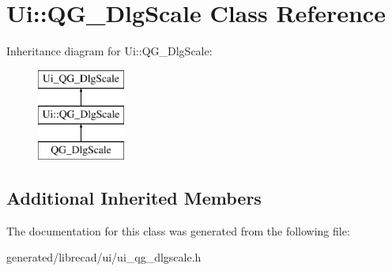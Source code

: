\hypertarget{classUi_1_1QG__DlgScale}{\section{Ui\-:\-:Q\-G\-\_\-\-Dlg\-Scale Class Reference}
\label{classUi_1_1QG__DlgScale}
}
Inheritance diagram for Ui\-:\-:Q\-G\-\_\-\-Dlg\-Scale\-:\begin{figure}[H]
\begin{center}
\leavevmode
\includegraphics[height=3.000000cm]{classUi_1_1QG__DlgScale}
\end{center}
\end{figure}
\subsection*{Additional Inherited Members}


The documentation for this class was generated from the following file\-:\begin{DoxyCompactItemize}
\item 
generated/librecad/ui/ui\-\_\-qg\-\_\-dlgscale.\-h\end{DoxyCompactItemize}
